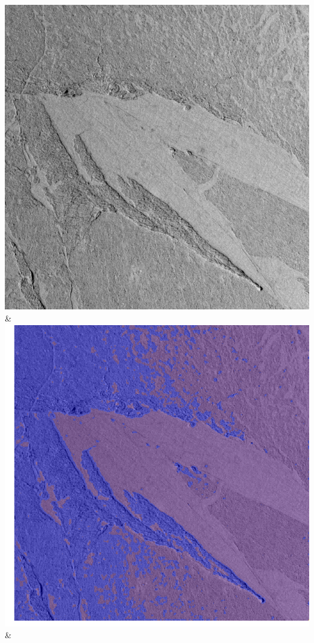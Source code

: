 \begin{table}[h!]
\begin{tabularx}{\textwidth}
		\includegraphics[width=0.9\linewidth]{images/p03/p03_03.png} &
		\includegraphics[width=0.9\linewidth]{images/gen/convolution_number/p03_03.png_2.png} &

\end{tabularx}
\end{table}
